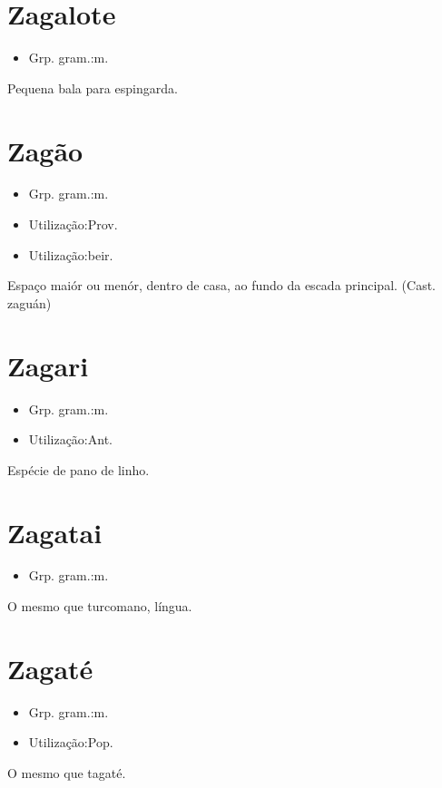 \section{Zagalote}
\begin{itemize}
\item {Grp. gram.:m.}
\end{itemize}
Pequena bala para espingarda.
\section{Zagão}
\begin{itemize}
\item {Grp. gram.:m.}
\end{itemize}
\begin{itemize}
\item {Utilização:Prov.}
\end{itemize}
\begin{itemize}
\item {Utilização:beir.}
\end{itemize}
Espaço maiór ou menór, dentro de casa, ao fundo da escada principal.
(Cast. \textunderscore zaguán\textunderscore )
\section{Zagari}
\begin{itemize}
\item {Grp. gram.:m.}
\end{itemize}
\begin{itemize}
\item {Utilização:Ant.}
\end{itemize}
Espécie de pano de linho.
\section{Zagatai}
\begin{itemize}
\item {Grp. gram.:m.}
\end{itemize}
O mesmo que \textunderscore turcomano\textunderscore , língua.
\section{Zagaté}
\begin{itemize}
\item {Grp. gram.:m.}
\end{itemize}
\begin{itemize}
\item {Utilização:Pop.}
\end{itemize}
O mesmo que \textunderscore tagaté\textunderscore .
